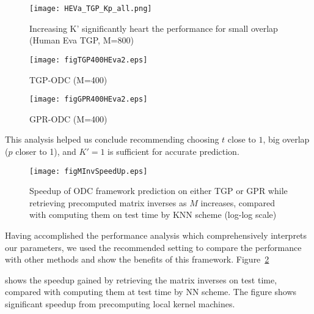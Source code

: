 \begin{figure}[t!]
\texttt{[image: HEVa\_TGP\_Kp\_all.png]}
\caption{Increasing K' significantly heart the performance for small overlap (Human Eva TGP,  M=800)}
\label{fig_K_all}
\end{figure}

\begin{figure*}[h!]
\centering
\begin{subfigure}[b]{1.0\textwidth}
 \texttt{[image: figTGP400HEva2.eps]}
  \caption{TGP-ODC (M=400)}
\end{subfigure}
\begin{subfigure}[b]{1.0\textwidth} \texttt{[image: figGPR400HEva2.eps]}
\caption{GPR-ODC (M=400)}
\end{subfigure}
\caption{Overlapping Domain Cover Parameter Analysis of GPR and TGP  on Human Eva Dataset (best seen in color) (M=400)}
\label{fig:ODCAnalysis400}
\end{figure*}


This analysis helped us conclude recommending choosing  $t$ close to $1$, big overlap ($p$ closer to 1), and $K'=1$ is sufficient for accurate prediction. 





\begin{figure}[h!]
\centering
\texttt{[image: figMInvSpeedUp.eps]}
  \caption{Speedup of ODC framework prediction on either TGP or GPR while retrieving precomputed matrix inverses as $M$ increases, compared with computing them on test time by KNN scheme (log-log scale)}
  \label{fig:SpeedUp}
\end{figure}
Having accomplished the performance analysis which comprehensively interprets our parameters, we used the recommended setting to compare the performance with other methods and show the benefits of this framework. Figure~\ref{fig:SpeedUp} shows the speedup gained by retrieving the matrix inverses on test time, compared with computing them at test time by NN scheme. The figure shows significant speedup from precomputing local kernel machines.  

